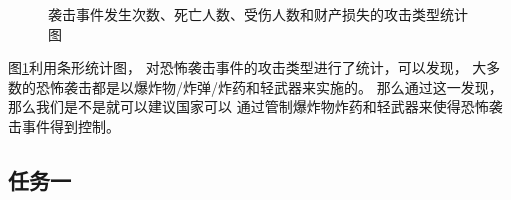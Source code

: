 \documentclass[bwprint]{gmcmthesis}
\begin{document}
\begin{figure}[htbp]
    \caption{袭击事件发生次数、死亡人数、受伤人数和财产损失的攻击类型统计图}
    \label{tab:攻击类型分布}
\end{figure}

图\ref{tab:攻击类型分布}利用条形统计图，
对恐怖袭击事件的攻击类型进行了统计，可以发现，
大多数的恐怖袭击都是以爆炸物/炸弹/炸药和轻武器来实施的。
那么通过这一发现，那么我们是不是就可以建议国家可以
通过管制爆炸物炸药和轻武器来使得恐怖袭击事件得到控制。


\subsection{任务一}
\end{document}
